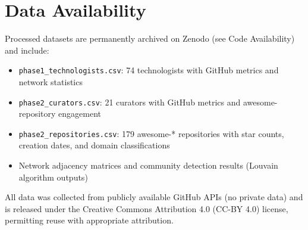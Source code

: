 \documentclass[11pt]{article}
\begin{document}
\section{Data Availability}

Processed datasets are permanently archived on Zenodo (see Code Availability) and include:
\begin{itemize}
    \item \texttt{phase1\_technologists.csv}: 74 technologists with GitHub metrics and network statistics
    \item \texttt{phase2\_curators.csv}: 21 curators with GitHub metrics and awesome-repository engagement
    \item \texttt{phase2\_repositories.csv}: 179 awesome-* repositories with star counts, creation dates, and domain classifications
    \item Network adjacency matrices and community detection results (Louvain algorithm outputs)
\end{itemize}

All data was collected from publicly available GitHub APIs (no private data) and is released under the Creative Commons Attribution 4.0 (CC-BY 4.0) license, permitting reuse with appropriate attribution.
\end{document}

